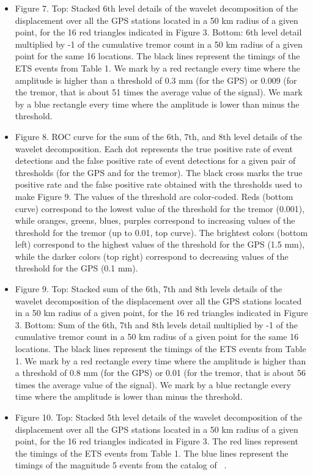\documentclass{article}
\begin{document}
\begin{itemize}
\item Figure 7. Top: Stacked 6th level details of the wavelet decomposition of the displacement over all the GPS stations located in a 50 km radius of a given point, for the 16 red triangles indicated in Figure 3. Bottom: 6th level detail multiplied by -1 of the cumulative tremor count in a 50 km radius of a given point for the same 16 locations. The black lines represent the timings of the ETS events from Table 1. We mark by a red rectangle every time where the amplitude is higher than a threshold of 0.3 mm (for the GPS) or 0.009 (for the tremor, that is about 51 times the average value of the signal). We mark by a blue rectangle every time where the amplitude is lower than minus the threshold.

\item Figure 8. ROC curve for the sum of the 6th, 7th, and 8th level details of the wavelet decomposition. Each dot represents the true positive rate of event detections and the false positive rate of event detections for a given pair of thresholds (for the GPS and for the tremor). The black cross marks the true positive rate and the false positive rate obtained with the thresholds used to make Figure 9. The values of the threshold are color-coded. Reds (bottom curve) correspond to the lowest value of the threshold for the tremor (0.001), while oranges, greens, blues, purples correspond to increasing values of the threshold for the tremor (up to 0.01, top curve). The brightest colors (bottom left) correspond to the highest values of the threshold for the GPS (1.5 mm), while the darker colors (top right) correspond to decreasing values of the threshold for the GPS (0.1 mm).

\item Figure 9. Top: Stacked sum of the 6th, 7th and 8th levels details of the wavelet decomposition of the displacement over all the GPS stations located in a 50 km radius of a given point, for the 16 red triangles indicated in Figure 3. Bottom: Sum of the 6th, 7th and 8th levels detail multiplied by -1 of the cumulative tremor count in a 50 km radius of a given point for the same 16 locations. The black lines represent the timings of the ETS events from Table 1. We mark by a red rectangle every time where the amplitude is higher than a threshold of 0.8 mm (for the GPS) or 0.01 (for the tremor, that is about 56 times the average value of the signal). We mark by a blue rectangle every time where the amplitude is lower than minus the threshold.

\item Figure 10. Top: Stacked 5th level details of the wavelet decomposition of the displacement over all the GPS stations located in a 50 km radius of a given point, for the 16 red triangles indicated in Figure 3. The red lines represent the timings of the ETS events from Table 1. The blue lines represent the timings of the magnitude 5 events from the catalog of ~\citet{MIC_2019}.


\end{itemize}
\end{document}
